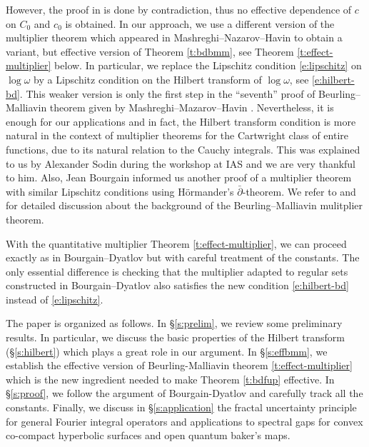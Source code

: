 \documentclass[reqno,12pt,letterpaper]{amsart}
\numberwithin{equation}{section}
\numberwithin{prop}{section}
\newcommand{\dbar}{\bar{\partial}}
\begin{document}
However, the proof in \cite{fullgap} is done by contradiction, thus no effective dependence of $c$ on $C_0$ and $c_0$ is obtained. In our approach, we use a different version of the multiplier theorem which appeared in Mashreghi--Nazarov--Havin \cite{bm7} to obtain a variant, but effective version of Theorem \ref{t:bdbmm}, see Theorem \ref{t:effect-multiplier} below. In particular, we replace the Lipschitz condition \eqref{e:lipschitz} on $\log\omega$ by a Lipschitz condition on the Hilbert transform of $\log\omega$, see \eqref{e:hilbert-bd}. This weaker version is only the first step in the ``seventh'' proof of Beurling--Malliavin theorem given by Mashreghi--Mazarov--Havin \cite{bm7}. Nevertheless, it is enough for our applications and in fact, the Hilbert transform condition is more natural in the context of multiplier theorems for the Cartwright class of entire functions, due to its natural relation to the Cauchy integrals. This was explained to us by Alexander Sodin during the workshop at IAS and we are very thankful to him. Also, Jean Bourgain \cite{bourgain} informed us another proof of a multiplier theorem with similar Lipschitz conditions using H\"{o}rmander's $\dbar$-theorem. We refer to \cite[\S 3.1]{bm7} and \cite[Part 2 \S 3.5]{up} for detailed discussion about the background of the Beurling--Malliavin mulitplier theorem.

With the quantitative multiplier Theorem \ref{t:effect-multiplier}, we can proceed exactly as in Bourgain--Dyatlov \cite{fullgap} but with careful treatment of the constants. The only essential difference is checking that the multiplier adapted to regular sets constructed in Bourgain--Dyatlov also satisfies the new condition \eqref{e:hilbert-bd} instead of \eqref{e:lipschitz}.


The paper is organized as follows. In \S \ref{s:prelim}, we review some preliminary results. In particular, we discuss the basic properties of the Hilbert transform (\S \ref{s:hilbert}) which plays a great role in our argument. In \S \ref{s:effbmm}, we establish the effective version of Beurling-Malliavin theorem \ref{t:effect-multiplier} which is the new ingredient needed to make Theorem \ref{t:bdfup} effective. In \S \ref{s:proof}, we follow the argument of Bourgain-Dyatlov \cite{fullgap} and carefully track all the constants. Finally, we discuss in \S \ref{s:application} the fractal uncertainty principle for general Fourier integral operators and applications to spectral gaps for convex co-compact hyperbolic surfaces and open quantum baker's maps. 
\end{document}
